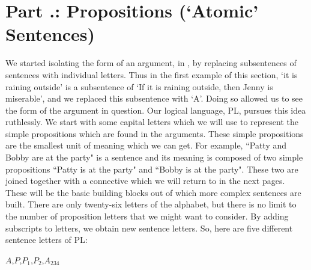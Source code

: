 \section{Part \thechapcount.\theseccount: Propositions (‘Atomic’ Sentences)}\label{s.atomic}
We started isolating the form of an argument, in , by replacing subsentences of sentences with individual letters. Thus in the first example of this section, ‘it is raining outside’ is a subsentence of ‘If it is raining outside, then Jenny is miserable’, and we replaced this subsentence with ‘A’. Doing so allowed us to see the form of the argument in question. Our logical language, PL, pursues this idea ruthlessly. We start with some capital letters which we will use to represent the simple propositions which are found in the arguments. These simple propositions are the smallest unit of meaning which we can get. For example, “Patty and Bobby are at the party" is a sentence and its meaning is composed of two simple propositions “Patty is at the party" and “Bobby is at the party". These two are joined together with a connective which we will return to in the next pages. These will be the basic building blocks out of which more complex sentences are built. There are only twenty-six letters of the alphabet, but there is no limit to the number of proposition letters that we might want to consider. By adding subscripts to letters, we obtain new \glspl{sentence letter}. So, here are five different sentence letters of PL:
\begin{center}$A$,$P$,$P_1$,$P_2$,$A_{234}$\end{center}

